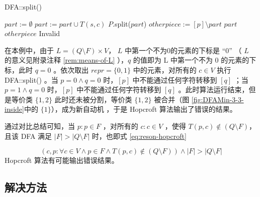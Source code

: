 \begin{algorithm}
    \caption{ DFA::split() }\label{al:split}
    \begin{algorithmic}[1]
         
            \Statex {}
            \State $part := \emptyset$ 
             
                    \State $part := part \cup T(s,c)$
                \EndIf
            \EndFor
                \State $P$.split($part$) 
                \State $otherpiece := [p] \setminus part$
                     {$part$}
                \Else
                     {$otherpiece$}
                \EndIf
            \Else
                 {Invalid}
            \EndIf
        \EndFunction
    \end{algorithmic}
\end{algorithm}

在本例中，由于 $L=(Q \setminus F) \times V$， $L$ 中第一个不为0的元素的下标是 “0” （ $L$ 的意义见附录注释 \ref{rem:means-of-L} ），$q$ 的值即为 L 中第一个不为 0 的元素的下标，此时 $q = 0$ 。依次取出 $repr = \{ 0,1 \}$ 中的元素，对所有的 $c \in V$ 执行 DFA::split() 。当 $p=0 \land q=0 $ 时，$[p]$ 中不能通过任何字符转移到 $[q]$ ；当 $p=1 \land q=0 $ 时，$[p]$ 中不能通过任何字符转移到 $[q]$ 。此时算法运行结束，但是等价类 $\{1,2 \}$ 此时还未被分割，等价类 $\{1,2 \}$ 被合并（图 \ref{fig:DFAMin-3-3-inside}中的 $\{ 1\}$），成为新自动机 ，于是 Hopcroft 算法输出了错误的结果。

通过对比总结可知，当 $p:p \in F$ ，对所有的 $c:c\in V$ ，使得 $ T(p,c) \notin (Q\setminus F)  $，且该 DFA 满足 $|F| > |Q \setminus F| $ 时，也即式 \ref{eq:reson-hopcroft}

\begin{equation}\label{eq:reson-hopcroft} 
    (c,p: \forall c \in V \land p \in F \land T(p,c) \notin (Q\setminus F) ) \land |F| > |Q \setminus F| 
\end{equation}
Hopcroft 算法有可能输出错误结果。

\subsection{解决方法}\label{subsec:solve-hopcroft}

